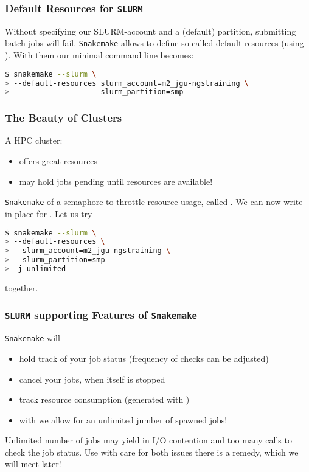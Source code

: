 \begin{frame}[fragile]
  \frametitle{Default Resources for \texttt{SLURM}}
  Without specifying our SLURM-account and a (default) partition, submitting batch jobs will fail. \texttt{Snakemake} allows to define so-called default resources (using ). With them our minimal command line becomes:
  \begin{lstlisting}[language=Bash, style=Shell, breaklines=true]
$ snakemake --slurm \
> --default-resources slurm_account=m2_jgu-ngstraining \
>                     slurm_partition=smp
  \end{lstlisting}
\end{frame}

\begin{frame}[fragile]
  \frametitle{The Beauty of Clusters}
  A HPC cluster:
  \begin{itemize}
   \item offers great resources
   \item may hold jobs pending until resources are available!
  \end{itemize}
  \pause
  \texttt{Snakemake} of a semaphore to throttle resource usage, called . We can now write  in place for . Let us try
  \begin{lstlisting}[language=Bash, style=Shell, basicstyle=\footnotesize]
$ snakemake --slurm \
> --default-resources \ 
>   slurm_account=m2_jgu-ngstraining \
>   slurm_partition=smp
> -j unlimited
  \end{lstlisting}
  together.
\end{frame}

\begin{frame}[fragile]
  \frametitle{\texttt{SLURM} supporting Features of \texttt{Snakemake}}
  \texttt{Snakemake} will
  \begin{itemize}[<+->]
   \item hold track of your job status (frequency of checks can be adjusted)
   \item cancel your jobs, when itself is stopped
   \item track resource consumption (generated with )
   \item with  we allow for an unlimited jumber of spawned jobs!
  \end{itemize}
  \pause
  \begin{warning}
  	Unlimited number of jobs may yield in I/O contention and too many calls to check the job status. Use with care for both issues there is a remedy, which we will meet later!
  \end{warning}
\end{frame}

